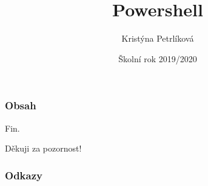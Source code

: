 \documentclass[table]{beamer}
\title{Powershell}
\author{Kristýna Petrlíková}
\date{Školní rok 2019/2020}
\begin{document}
\begin{frame}
	\titlepage
\end{frame}

\begin{frame}
\frametitle{Obsah}
\hfill
\tableofcontents[hideallsubsections]
\end{frame}









\begin{frame}{Fin.}
  \begin{center}
    \Huge Děkuji za pozornost!
  \end{center}
\end{frame}

\begin{frame}[t,allowframebreaks]
\nocite{*}
\frametitle{Odkazy}
\printbibliography
\end{frame}
\end{document}
